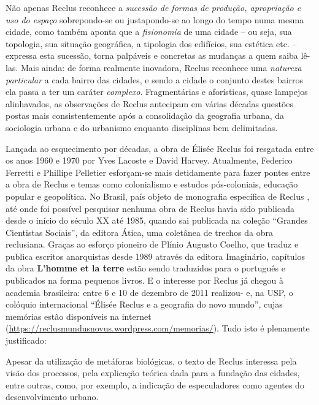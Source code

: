 Não apenas Reclus reconhece a \textit{sucessão de formas de produção, apropriação e uso do espaço} sobrepondo-se ou justapondo-se ao longo do tempo numa mesma cidade, como também aponta que a \textit{fisionomia} de uma cidade -- ou seja, sua topologia, sua situação geográfica, a tipologia dos edifícios, sua estética etc. -- expressa esta sucessão, torna palpáveis e concretas as mudanças a quem saiba lê-las. Mais ainda: de forma realmente inovadora, Reclus reconhece uma \textit{natureza particular} a cada bairro das cidades, e sendo a cidade o conjunto destes bairros ela passa a ter um caráter \textit{complexo}. Fragmentárias e aforísticas, quase lampejos alinhavados, as observações de Reclus antecipam em várias décadas questões postas mais consistentemente após a consolidação da geografia urbana, da sociologia urbana e do urbanismo enquanto disciplinas bem delimitadas.

Lançada ao esquecimento por décadas, a obra de Élisée Reclus foi resgatada entre os anos 1960 e 1970 por Yves Lacoste e David Harvey. Atualmente, Federico Ferretti e Phillipe Pelletier esforçam-se mais detidamente para fazer pontes entre a obra de Reclus e temas como colonialismo e estudos pós-coloniais, educação popular e geopolítica. No Brasil, país objeto de monografia específica de Reclus \cite{RECLUS1900}, até onde foi possível pesquisar nenhuma obra de Reclus havia sido publicada desde o início do século XX até 1985, quando sai publicada na coleção ``Grandes Cientistas Sociais'', da editora Ática, uma coletânea de trechos da obra reclusiana. Graças ao esforço pioneiro de Plínio Augusto Coelho, que traduz e publica escritos anarquistas desde 1989 através da editora Imaginário, capítulos da obra \textbf{L'homme et la terre }estão sendo traduzidos para o português e publicados na forma pequenos livros. E o interesse por Reclus já chegou à academia brasileira: entre 6 e 10 de dezembro de 2011 realizou- e, na USP, o colóquio internacional ``Élisée Reclus e a geografia do novo mundo'', cujas memórias estão disponíveis na internet (\url{https://reclusmundusnovus.wordpress.com/memorias/}). Tudo isto é plenamente justificado:

\begin{citacao}
Apesar da utilização de metáforas biológicas, o texto de Reclus interessa pela visão dos processos, pela explicação teórica dada para a fundação das cidades, entre outras, como, por exemplo, a indicação de especuladores como agentes do desenvolvimento urbano. \cite[p.~65]{vasconcelos_dois_2012}
\end{citacao}

